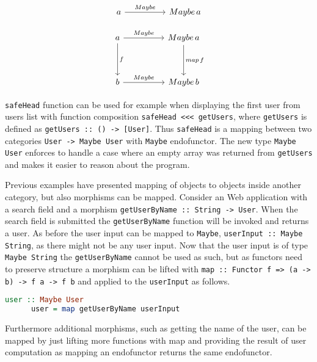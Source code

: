 \documentclass[article]{aaltoseries}
\begin{document}
    \[
      \begin{tikzcd}[row sep=huge, column sep=huge]
        a \arrow[r, "Maybe"]
        & Maybe\, a
      \end{tikzcd}
    \]

    \[
      \begin{tikzcd}[row sep=huge, column sep=huge]
        a \arrow[r, "Maybe"]
        \arrow[d, "f"]
        & Maybe\, a
        \arrow[d, "map\, f"]
        \\
        b \arrow[r, "Maybe"]
        & Maybe\, b
      \end{tikzcd}
    \]

    \lstinline|safeHead| function can be used for example when displaying the
    first user from users list with function composition
    \lstinline|safeHead <<< getUsers|, where \lstinline|getUsers| is defined as
    \lstinline|getUsers :: () -> [User]|. Thus \lstinline|safeHead| is a mapping
    between two categories \lstinline|User -> Maybe User| with \lstinline|Maybe|
    endofunctor. The new type \lstinline|Maybe User| enforces to handle a case
    where an empty array was returned from \lstinline|getUsers| and makes it
    easier to reason about the program.
 
    Previous examples have presented mapping of objects to objects inside
    another category, but also morphisms can be mapped. Consider an Web
    application with a search field and a morphism
    \lstinline|getUserByName :: String -> User|. When the search field is
    submitted the \lstinline|getUserByName| function will be invoked and returns
    a user. As before the user input can be mapped to \lstinline|Maybe|,
    \lstinline|userInput :: Maybe String|, as there might not be any user input.
    Now that the user input is of type \lstinline|Maybe String| the
    \lstinline|getUserByName| cannot be used as such, but as functors need to
    preserve structure a morphism can be lifted with
    \lstinline|map :: Functor f => (a -> b) -> f a -> f b| and applied to the
    \lstinline|userInput| as follows. 

    \begin{lstlisting}[language=Haskell]
      user :: Maybe User
      user = map getUserByName userInput
    \end{lstlisting}

    Furthermore additional morphisms, such as getting the name of the user, can
    be mapped by just lifting more functions with map and providing the result
    of user computation as mapping an endofunctor returns the same endofunctor.
 
\end{document}
